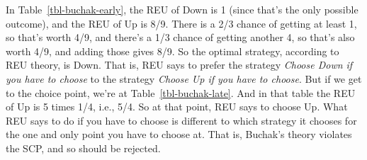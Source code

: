 \documentclass[
  11pt,
  letterpaper,
  DIV=11,
  numbers=noendperiod,
  twoside]{scrartcl}
\begin{document}
\begin{table}

\caption{\label{tbl-panel}Two strategy tables for
Figure~\ref{fig-buchak}.}

\begin{minipage}{0.50\linewidth}



\end{minipage}%
%
\begin{minipage}{0.50\linewidth}



\end{minipage}%

\end{table}%

In Table~\ref{tbl-buchak-early}, the REU of Down is 1 (since that's the
only possible outcome), and the REU of Up is 8/9. There is a 2/3 chance
of getting at least 1, so that's worth 4/9, and there's a 1/3 chance of
getting another 4, so that's also worth 4/9, and adding those gives 8/9.
So the optimal strategy, according to REU theory, is Down. That is, REU
says to prefer the strategy \emph{Choose Down if you have to choose} to
the strategy \emph{Choose Up if you have to choose}. But if we get to
the choice point, we're at Table~\ref{tbl-buchak-late}. And in that
table the REU of Up is 5 times 1/4, i.e., 5/4. So at that point, REU
says to choose Up. What REU says to do if you have to choose is
different to which strategy it chooses for the one and only point you
have to choose at. That is, Buchak's theory violates the SCP, and so
should be rejected.
\end{document}
